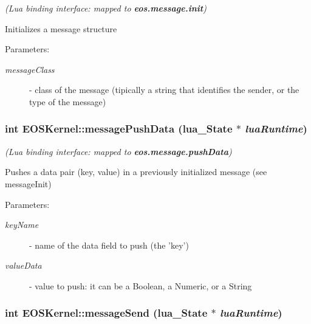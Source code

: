 {\em (Lua binding interface: mapped to {\bf eos.message.init})\/}\par
\par
 Initializes a message structure 

\begin{Desc}
\item[Parameters:]
\begin{description}
\item[{\em messageClass}]- class of the message (tipically a string that identifies the sender, or the type of the message) \end{description}
\end{Desc}
\hypertarget{structEOSKernel_a41c8c1590f49342c901ac8e0c055e2c}{
\subsubsection[{messagePushData}]{\setlength{\rightskip}{0pt plus 5cm}int EOSKernel::messagePushData (lua\_\-State $\ast$ {\em luaRuntime})}}
\label{structEOSKernel_a41c8c1590f49342c901ac8e0c055e2c}


{\em (Lua binding interface: mapped to {\bf eos.message.pushData})\/}\par
\par
 Pushes a data pair (key, value) in a previously initialized message (see messageInit) 

\begin{Desc}
\item[Parameters:]
\begin{description}
\item[{\em keyName}]- name of the data field to push (the 'key') \item[{\em valueData}]- value to push: it can be a Boolean, a Numeric, or a String \end{description}
\end{Desc}
\hypertarget{structEOSKernel_3d3c99f27856467254fdbc66388e059f}{
\subsubsection[{messageSend}]{\setlength{\rightskip}{0pt plus 5cm}int EOSKernel::messageSend (lua\_\-State $\ast$ {\em luaRuntime})}}
\label{structEOSKernel_3d3c99f27856467254fdbc66388e059f}


